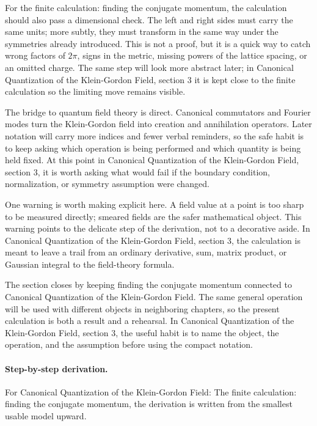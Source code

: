 For the finite calculation: finding the conjugate momentum, the calculation should also pass a dimensional check.  The left and right sides must carry the same units; more subtly, they must transform in the same way under the symmetries already introduced.  This is not a proof, but it is a quick way to catch wrong factors of \(2\pi\), signs in the metric, missing powers of the lattice spacing, or an omitted charge.  The same step will look more abstract later; in Canonical Quantization of the Klein-Gordon Field, section 3 it is kept close to the finite calculation so the limiting move remains visible.

The bridge to quantum field theory is direct.  Canonical commutators and Fourier modes turn the Klein-Gordon field into creation and annihilation operators.  Later notation will carry more indices and fewer verbal reminders, so the safe habit is to keep asking which operation is being performed and which quantity is being held fixed.  At this point in Canonical Quantization of the Klein-Gordon Field, section 3, it is worth asking what would fail if the boundary condition, normalization, or symmetry assumption were changed.

One warning is worth making explicit here.  A field value at a point is too sharp to be measured directly; smeared fields are the safer mathematical object.  This warning points to the delicate step of the derivation, not to a decorative aside.  In Canonical Quantization of the Klein-Gordon Field, section 3, the calculation is meant to leave a trail from an ordinary derivative, sum, matrix product, or Gaussian integral to the field-theory formula.

The section closes by keeping finding the conjugate momentum connected to Canonical Quantization of the Klein-Gordon Field.  The same general operation will be used with different objects in neighboring chapters, so the present calculation is both a result and a rehearsal.  In Canonical Quantization of the Klein-Gordon Field, section 3, the useful habit is to name the object, the operation, and the assumption before using the compact notation.



\paragraph{Step-by-step derivation.}

For Canonical Quantization of the Klein-Gordon Field: The finite calculation: finding the conjugate momentum, the derivation is written from the smallest usable model upward.

